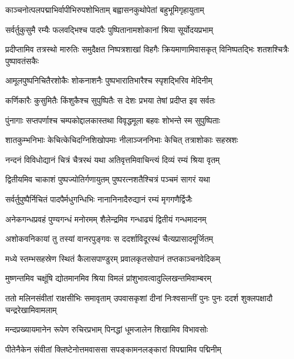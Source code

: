 \twolineshloka
{काञ्चनोत्पलपद्माभिर्वापीभिरुपशोभिताम्}
{बह्वासनकुथोपेतां बहुभूमिगृहायुताम्} %

\twolineshloka
{सर्वर्तुकुसुमै रम्यैः फलवद्भिश्च पादपैः}
{पुष्पितानामशोकानां श्रिया सूर्योदयप्रभाम्} %

\threelineshloka
{प्रदीप्तामिव तत्रस्थो मारुतिः समुदैक्षत}
{निष्पत्रशाखां विहगैः क्रियमाणामिवासकृत्}
{विनिष्पतद्भिः शतशश्चित्रैः पुष्पावतंसकैः} %

\twolineshloka
{आमूलपुष्पनिचितैरशोकैः शोकनाशनैः}
{पुष्पभारातिभारैश्च स्पृशद्भिरिव मेदिनीम्} %

\twolineshloka
{कर्णिकारैः कुसुमितैः किंशुकैश्च सुपुष्पितैः}
{स देशः प्रभया तेषां प्रदीप्त इव सर्वतः} %

\twolineshloka
{पुंनागाः सप्तपर्णाश्च चम्पकोद्दालकास्तथा}
{विवृद्धमूला बहवः शोभन्ते स्म सुपुष्पिताः} %

\twolineshloka
{शातकुम्भनिभाः केचित्केचिदग्निशिखोपमाः}
{नीलाञ्जननिभाः केचित् तत्राशोकाः सहस्रशः} %

\twolineshloka
{नन्दनं विविधोद्यानं चित्रं चैत्ररथं यथा}
{अतिवृत्तमिवाचिन्त्यं दिव्यं रम्यं श्रिया वृतम्} %

\twolineshloka
{द्वितीयमिव चाकाशं पुष्पज्योतिर्गणायुतम्}
{पुष्परत्नशतैश्चित्रं पञ्चमं सागरं यथा} %

\twolineshloka
{सर्वर्तुपुष्पैर्निचितं पादपैर्मधुगन्धिभिः}
{नानानिनादैरुद्यानं रम्यं मृगगणैर्द्विजैः} %

\twolineshloka
{अनेकगन्धप्रवहं पुण्यगन्धं मनोरमम्}
{शैलेन्द्रमिव गन्धाढ्यं द्वितीयं गन्धमादनम्} %

\twolineshloka
{अशोकवनिकायां तु तस्यां वानरपुङ्गवः}
{स ददर्शाविदूरस्थं चैत्यप्रासादमूर्जितम्} %

\twolineshloka
{मध्ये स्तम्भसहस्रेण स्थितं कैलासपाण्डुरम्}
{प्रवालकृतसोपानं तप्तकाञ्चनवेदिकम्} %

\twolineshloka
{मुष्णन्तमिव चक्षूंषि द्योतमानमिव श्रिया}
{विमलं प्रांशुभावत्वादुल्लिखन्तमिवाम्बरम्} %

\threelineshloka
{ततो मलिनसंवीतां राक्षसीभिः समावृताम्}
{उपवासकृशां दीनां निःश्वसान्तीं पुनः पुनः}
{ददर्श शुक्लपक्षादौ चन्द्ररेखामिवामलाम्} %

\twolineshloka
{मन्दप्रख्यायमानेन रूपेण रुचिरप्रभाम्}
{पिनद्धां धूमजालेन शिखामिव विभावसोः} %

\twolineshloka
{पीतेनैकेन संवीतां क्लिष्टेनोत्तमवाससा}
{सपङ्कामनलङ्कारां विपद्मामिव पद्मिनीम्} %

